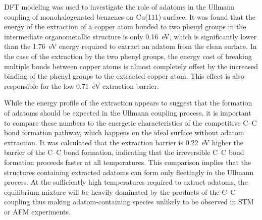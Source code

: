 \documentclass[%
 reprint,
 amsmath,amssymb,
 aps,
prb,
floatfix,
]{revtex4-2}
\newcommand{\lock}{\color{red}}
\newcommand{\lock}{\color{black}}
\begin{document}
{\lock

DFT modeling was used to investigate the role of adatoms in the Ullmann coupling of monohalogenated benzenes on Cu(111) surface. It was found that the energy of the extraction of a copper atom bonded to two phenyl groups in the intermediate organometallic structure is only \SI{0.16}{\electronvolt}, which is significantly lower than the \SI{1.76}{\electronvolt} energy required to extract an adatom from the clean surface. In the case of the extraction by the two phenyl groups, the energy cost of breaking multiple bonds between copper atoms is almost completely offset by the increased binding of the phenyl groups to the extracted copper atom. This effect is also responsible for the low \SI{0.71}{\electronvolt} extraction barrier. 


While the energy profile of the extraction appears to suggest that the formation of adatoms should be expected in the Ullmann coupling process, it is important to compare these numbers to the energetic characteristics of the competitive C--C bond formation pathway, which happens on the ideal surface without adatom extraction. It was calculated that the extraction barrier is \SI{0.22}{\electronvolt} higher the barrier of the C--C bond formation, indicating that the irreversible C--C bond formation proceeds faster at all temperatures. This comparison implies that the structures containing extracted adatoms can form only fleetingly in the Ullmann process. At the sufficiently high temperatures required to extract adatoms, the equilibrium mixture will be heavily dominated by the products of the C--C coupling thus making adatom-containing species unlikely to be observed in STM or AFM experiments.





}
\end{document}
